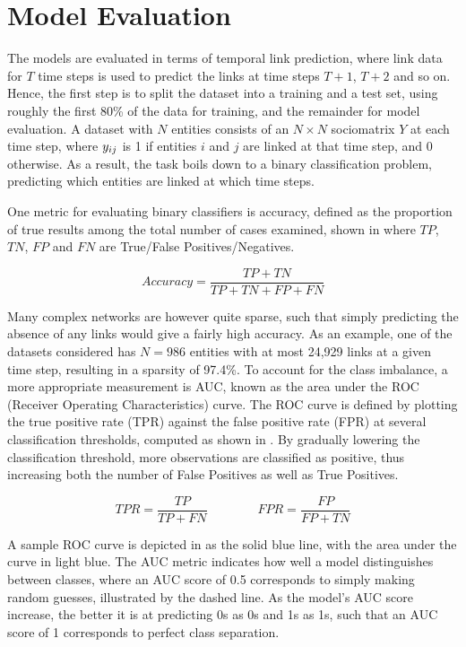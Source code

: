 \section{Model Evaluation}

The models are evaluated in terms of temporal link prediction, where link data for $T$ time steps is used to predict the links at time steps $T+1$, $T+2$ and so on. Hence, the first step is to split the dataset into a training and a test set, using roughly the first 80\% of the data for training, and the remainder for model evaluation. A dataset with $N$ entities consists of an $N\times N$ sociomatrix $Y$ at each time step, where $\sub(y)$ is 1 if entities $i$ and $j$ are linked at that time step, and 0 otherwise. As a result, the task boils down to a binary classification problem, predicting which entities are linked at which time steps.

One metric for evaluating binary classifiers is accuracy, defined as the proportion of true results among the total number of cases examined, shown in  where $TP$, $TN$, $FP$ and $FN$ are True/False Positives/Negatives.

\begin{equation}\label{eq:eval-accuracy}
    Accuracy = \frac{TP+TN}{TP+TN+FP+FN}
\end{equation}

Many complex networks are however quite sparse, such that simply predicting the absence of any links would give a fairly high accuracy. As an example, one of the datasets considered has $N=986$ entities with at most 24,929 links at a given time step, resulting in a sparsity of 97.4\%. To account for the class imbalance, a more appropriate measurement is AUC, known as the area under the ROC (Receiver Operating Characteristics) curve. The ROC curve is defined by plotting the true positive rate (TPR) against the false positive rate (FPR) at several classification thresholds, computed as shown in . By gradually lowering the classification threshold, more observations are classified as positive, thus increasing both the number of False Positives as well as True Positives.

\begin{equation}\label{eq:eval-tpr-fpr}
    TPR = \frac{TP}{TP + FN} \qquad\qquad FPR = \frac{FP}{FP + TN}
\end{equation}

A sample ROC curve is depicted in  as the solid blue line, with the area under the curve in light blue.
The AUC metric indicates how well a model distinguishes between classes, where an AUC score of 0.5 corresponds to simply making random guesses, illustrated by the dashed line. As the model's AUC score increase, the better it is at predicting 0s as 0s and 1s as 1s, such that an AUC score of 1 corresponds to perfect class separation.


